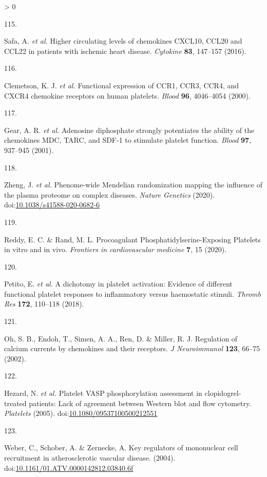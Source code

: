 \documentclass[11pt,twoside]{bristolthesis}
\newlength{\cslhangindent}
\newlength{\csllabelwidth}
\newenvironment{CSLReferences}[2] %
 {%
  \setlength{\parindent}{0pt}
  \ifodd #1 \everypar{\setlength{\hangindent}{\cslhangindent}}\ignorespaces\fi
  \ifnum #2 > 0
  \setlength{\parskip}{#2\baselineskip}
  \fi
 }%
 {}
\newcommand{\CSLLeftMargin}[1]{\parbox[t]{\csllabelwidth}{#1}}
\newcommand{\CSLRightInline}[1]{\parbox[t]{\linewidth - \csllabelwidth}{#1}\break}
\begin{document}
\begin{CSLReferences}{0}{0}
\leavevmode\hypertarget{ref-Safa2016}{}%
\CSLLeftMargin{115. }
\CSLRightInline{Safa, A. \emph{et al.} {Higher circulating levels of chemokines CXCL10, CCL20 and CCL22 in patients with ischemic heart disease}. \emph{Cytokine} \textbf{83}, 147--157 (2016).}

\leavevmode\hypertarget{ref-Clemetson2000}{}%
\CSLLeftMargin{116. }
\CSLRightInline{Clemetson, K. J. \emph{et al.} {Functional expression of CCR1, CCR3, CCR4, and CXCR4 chemokine receptors on human platelets}. \emph{Blood} \textbf{96}, 4046--4054 (2000).}

\leavevmode\hypertarget{ref-Gear2001}{}%
\CSLLeftMargin{117. }
\CSLRightInline{Gear, A. R. \emph{et al.} {Adenosine diphosphate strongly potentiates the ability of the chemokines MDC, TARC, and SDF-1 to stimulate platelet function}. \emph{Blood} \textbf{97}, 937--945 (2001).}

\leavevmode\hypertarget{ref-Zheng2020}{}%
\CSLLeftMargin{118. }
\CSLRightInline{Zheng, J. \emph{et al.} {Phenome-wide Mendelian randomization mapping the influence of the plasma proteome on complex diseases}. \emph{Nature Genetics} (2020). doi:\href{https://doi.org/10.1038/s41588-020-0682-6}{10.1038/s41588-020-0682-6}}

\leavevmode\hypertarget{ref-Reddy2020}{}%
\CSLLeftMargin{119. }
\CSLRightInline{Reddy, E. C. \& Rand, M. L. {Procoagulant Phosphatidylserine-Exposing Platelets in vitro and in vivo}. \emph{Frontiers in cardiovascular medicine} \textbf{7}, 15 (2020).}

\leavevmode\hypertarget{ref-Petito2018}{}%
\CSLLeftMargin{120. }
\CSLRightInline{Petito, E. \emph{et al.} {A dichotomy in platelet activation: Evidence of different functional platelet responses to inflammatory versus haemostatic stimuli}. \emph{Thromb Res} \textbf{172}, 110--118 (2018).}

\leavevmode\hypertarget{ref-Oh2002}{}%
\CSLLeftMargin{121. }
\CSLRightInline{Oh, S. B., Endoh, T., Simen, A. A., Ren, D. \& Miller, R. J. {Regulation of calcium currents by chemokines and their receptors}. \emph{J Neuroimmunol} \textbf{123}, 66--75 (2002).}

\leavevmode\hypertarget{ref-Hezard2005}{}%
\CSLLeftMargin{122. }
\CSLRightInline{Hezard, N. \emph{et al.} {Platelet VASP phosphorylation assessment in clopidogrel-treated patients: Lack of agreement between Western blot and flow cytometry}. \emph{Platelets} (2005). doi:\href{https://doi.org/10.1080/09537100500212551}{10.1080/09537100500212551}}

\leavevmode\hypertarget{ref-Weber2004}{}%
\CSLLeftMargin{123. }
\CSLRightInline{Weber, C., Schober, A. \& Zernecke, A. {Key regulators of mononuclear cell recruitment in atherosclerotic vascular disease}. (2004). doi:\href{https://doi.org/10.1161/01.ATV.0000142812.03840.6f}{10.1161/01.ATV.0000142812.03840.6f}}


\end{CSLReferences}
\end{document}
